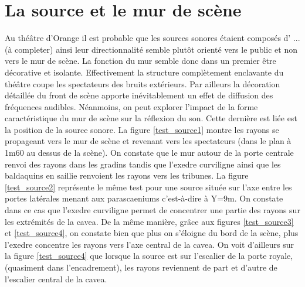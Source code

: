 \section{La source et le mur de scène}

Au théâtre d'Orange il est probable que les sources sonores étaient composés d' ... (à completer)
ainsi leur directionnalité semble plutôt orienté vers le public et non vers le mur de scène. La fonction du mur semble donc dans un premier être décorative et isolante. Effectivement la structure complètement enclavante du théâtre coupe les spectateurs des bruits extérieurs. Par ailleurs la décoration détaillée du front de scène apporte inévitablement un effet de diffusion des  fréquences audibles. Néanmoins, on peut explorer l'impact de la forme caractéristique du mur de scène sur la réflexion du son. Cette dernière est liée est la position de la source sonore. La figure \ref{test_source1} montre les rayons se propageant vers le mur de scène et revenant vers les spectateurs (dans le plan à 1m60 au dessus de la scène). On constate que le mur autour de la porte centrale renvoi des rayons dans les gradins tandis que l'\gls{exedre} curviligne ainsi que les baldaquins en saillie renvoient les rayons vers les tribunes. La figure \ref{test_source2} représente le même test pour une source située sur l'axe entre les portes latérales menant aux \glspl{parascaenium} c'est-à-dire à Y=9m. On constate dans ce cas que l'\gls{exedre} curviligne permet de concentrer une partie des rayons sur les extrémités de la \gls{cavea}. De la même manière, grâce aux figures \ref{test_source3} et \ref{test_source4}, on constate bien que plus on s'éloigne du bord de la scène, plus l'\gls{exedre} concentre les rayons vers l'axe central de la \gls{cavea}. On voit d'ailleurs sur la figure \ref{test_source4} que lorsque la source est sur l'escalier de la porte royale, (quasiment dans l'encadrement), les rayons reviennent de part et d'autre de l'escalier central de la \gls{cavea}. 

